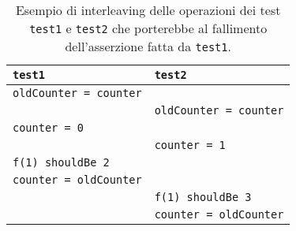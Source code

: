 \begin{table}[!ht]
  \centering
  \begin{tabular}{ll}
    \toprule
    \lstinline|test1|                & \lstinline|test2|                \\
    \midrule
    \lstinline|oldCounter = counter| &                                  \\
                                     & \lstinline|oldCounter = counter| \\
    \lstinline|counter = 0|          &                                  \\
                                     & \lstinline|counter = 1|          \\
    \lstinline|f(1) shouldBe 2|      &                                  \\
    \lstinline|counter = oldCounter| &                                  \\
                                     & \lstinline|f(1) shouldBe 3|      \\
                                     & \lstinline|counter = oldCounter| \\
    \bottomrule
  \end{tabular}
  \caption{Esempio di interleaving delle operazioni dei test \lstinline|test1| e \lstinline|test2| che porterebbe al fallimento dell'asserzione fatta da \lstinline|test1|.}
  \label{table:test-f-interleaving-fail}
\end{table}